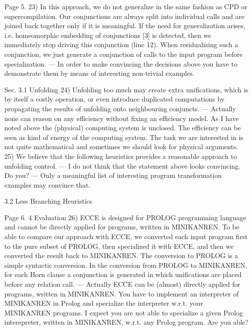 Page 5.
23) In this approach, we do not generalize in the same fashion as CPD or supercompilation. Our conjunctions are always split into individual calls and are joined back together only if it is meaningful. If the need for generalization arises, i.e. homeomorphic embedding of conjunctions [3] is detected, then we immediately stop driving this conjunction (line 12). When residualizing such a conjunction, we just generate a conjunction of calls to the input program before specialization.
 --- In order to make convincing the decisions above you have to demonstrate them by means of interesting non-trivial examples.

Sec. 3.1 Unfolding
24) Unfolding too much may create extra unifications, which is by itself a costly operation, or even introduce duplicated computations by propagating the results of unfolding onto neighbouring conjuncts.
 --- Actually none can reason on any efficiency without fixing an efficiency model. As I have noted above the (physical) computing system is unclosed. The efficiency can be seen as kind of energy of the computing system. The task we are interested in is not quite mathematical and sometimes we should look for physical arguments.
25) We believe that the following heuristics provides a reasonable approach to unfolding control.
 --- I do not think that the statement above looks convincing. Do you?
 --- Only a meaningful list of interesting program transformation examples may convince that.


3.2 Less Branching Heuristics

Page 6.
4 Evaluation
26) ECCE is designed for PROLOG programming language and cannot be directly applied for programs, written in MINIKANREN. To be able to compare our approach with ECCE, we converted each input program first to the pure subset of PROLOG, then specialized it with ECCE, and then we converted the result back to MINIKANREN. The conversion to PROLOG is a simple syntactic conversion. In the conversion from PROLOG to MINIKANREN, for each Horn clause a conjunction is generated in which unifications are placed before any relation call.
 --- Actually ECCE can be (almost) directly applied for programs, written in MINIKANREN. You have to implement an interpreter of MINIKANREN in Prolog and specialize the interpreter w.r.t. your MINIKANREN programs. I expect you are not able to specialize a given Prolog interepreter, written in MINIKANREN,  w.r.t. any Prolog program. Are you able?

